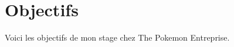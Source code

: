 \documentclass[../main.tex]{subfiles}
\begin{document}
\section{Objectifs}

Voici les objectifs de mon stage chez The Pokemon Entreprise.
\end{document}

